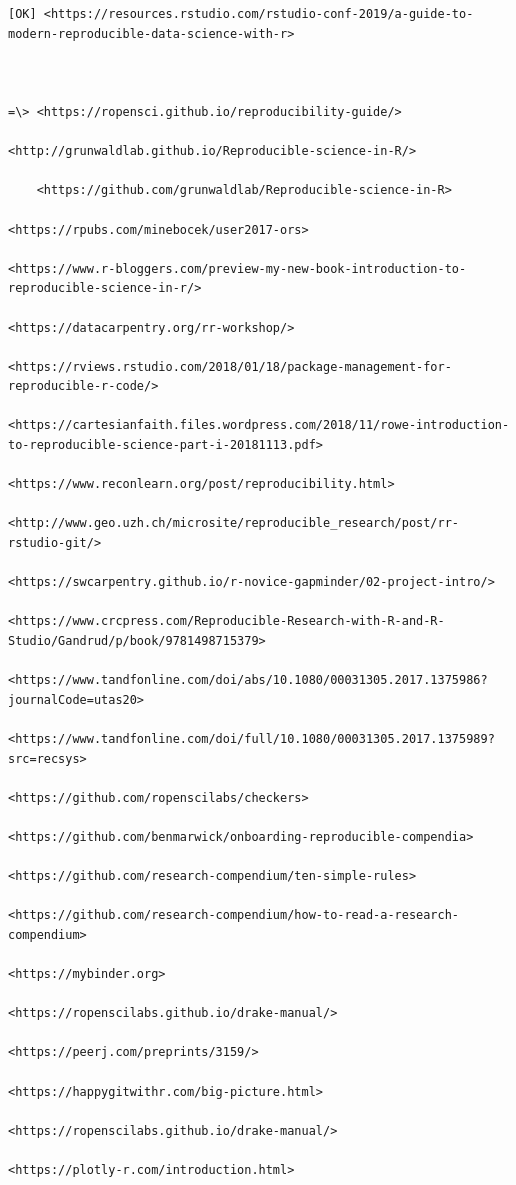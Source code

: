 \documentclass[
]{book}
\begin{document}
\begin{verbatim}
[OK] <https://resources.rstudio.com/rstudio-conf-2019/a-guide-to-modern-reproducible-data-science-with-r>



=\> <https://ropensci.github.io/reproducibility-guide/>

<http://grunwaldlab.github.io/Reproducible-science-in-R/>

    <https://github.com/grunwaldlab/Reproducible-science-in-R>

<https://rpubs.com/minebocek/user2017-ors>

<https://www.r-bloggers.com/preview-my-new-book-introduction-to-reproducible-science-in-r/>

<https://datacarpentry.org/rr-workshop/>

<https://rviews.rstudio.com/2018/01/18/package-management-for-reproducible-r-code/>

<https://cartesianfaith.files.wordpress.com/2018/11/rowe-introduction-to-reproducible-science-part-i-20181113.pdf>

<https://www.reconlearn.org/post/reproducibility.html>

<http://www.geo.uzh.ch/microsite/reproducible_research/post/rr-rstudio-git/>

<https://swcarpentry.github.io/r-novice-gapminder/02-project-intro/>

<https://www.crcpress.com/Reproducible-Research-with-R-and-R-Studio/Gandrud/p/book/9781498715379>

<https://www.tandfonline.com/doi/abs/10.1080/00031305.2017.1375986?journalCode=utas20>

<https://www.tandfonline.com/doi/full/10.1080/00031305.2017.1375989?src=recsys>

<https://github.com/ropenscilabs/checkers>

<https://github.com/benmarwick/onboarding-reproducible-compendia>

<https://github.com/research-compendium/ten-simple-rules>

<https://github.com/research-compendium/how-to-read-a-research-compendium>

<https://mybinder.org>

<https://ropenscilabs.github.io/drake-manual/>

<https://peerj.com/preprints/3159/>

<https://happygitwithr.com/big-picture.html>

<https://ropenscilabs.github.io/drake-manual/>

<https://plotly-r.com/introduction.html>
\end{verbatim}
\end{document}
